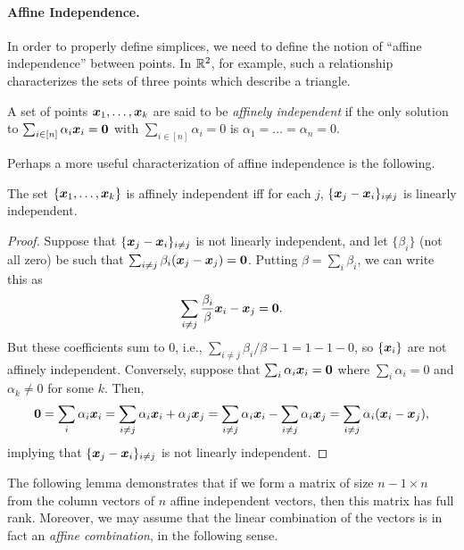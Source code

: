 \paragraph{Affine Independence.}
In order to properly define simplices, we need to define the  notion of ``affine independence'' between  points.  In $\mathbb{R}^2$, for example, such a relationship characterizes the sets of three points which describe a triangle. 


\begin{definition}
	\label{def:affine_independence}
A set of points $\vb*{x}_1,\dots,\vb*{x}_k$ are said to be \emph{affinely independent} if the only solution to $\sum_{i\in[n]}\alpha_i\vb*{x}_i=\vb{0}$ with $\sum_{i\in [n]}\alpha_i=0$ is $\alpha_1=\dots=\alpha_n=0$. 
\end{definition}

Perhaps a more useful characterization of affine independence is the following. 

\begin{lemma}
	\label{lem:affine-linearly-independent}
	The set $\{\vb*{x}_1,\dots,\vb*{x}_k\}$ is affinely independent iff for each $j$, $\{\vb*{x}_j-\vb*{x}_i\}_{i\neq j}$ is linearly independent. 
\end{lemma}
\begin{proof}
	Suppose that $\{\vb*{x}_j-\vb*{x}_i\}_{i\neq j}$ is not linearly independent, and let $\{\beta_i\}$ (not all zero) be such that $\sum_{i\neq j}\beta_i (\vb*{x}_j-\vb*{x}_j)=\vb{0}$. Putting $\beta=\sum_i \beta_i$, we can write this as 
	\[\sum_{i\neq j}\frac{\beta_i}{\beta}\vb*{x}_i - \vb*{x}_j=\vb{0}.\]
	But these coefficients sum to 0, i.e., $\sum_{i\neq j}\beta_i/\beta -1=1-1-0$, so $\{\vb*{x}_i\}$ are not affinely independent. Conversely, suppose that $\sum_i\alpha_i\vb*{x}_i=\vb{0}$ where $\sum_i\alpha_i=0$ and $\alpha_k\neq 0$ for some $k$. Then, 
	\[\vb{0} =\sum_i\alpha_i\vb*{x}_i = \sum_{i\neq j}\alpha_i\vb*{x}_i + \alpha_j\vb*{x}_j = \sum_{i\neq j}\alpha_i\vb*{x}_i - \sum_{i\neq j}\alpha_i\vb*{x}_j = \sum_{i\neq j}\alpha_i(\vb*{x}_i-\vb*{x}_j), \]
	implying that $\{\vb*{x}_j-\vb*{x}_i\}_{i\neq j}$ is not linearly independent. 
\end{proof}

The following lemma demonstrates that if we form a matrix of size $n-1\times n$ from the column vectors of $n$  affine independent vectors, then this matrix has full rank. Moreover, we may assume that the linear combination of the vectors is in fact an \emph{affine combination}, in the  following sense. 

